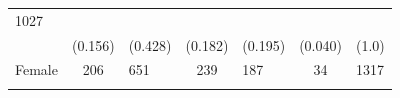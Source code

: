 \documentclass[11pt,a4paper,openany]{book}
\begin{document}
\begin{longtable}[]{@{}lclclcl@{}}
\begin{minipage}[t]{0.03\columnwidth}
1027\strut
\end{minipage}\tabularnewline
\begin{minipage}[t]{0.29\columnwidth}\raggedright\strut
\strut
\end{minipage} & \begin{minipage}[t]{0.29\columnwidth}\centering\strut
(0.156)\strut
\end{minipage} & \begin{minipage}[t]{0.04\columnwidth}\raggedright\strut
(0.428)\strut
\end{minipage} & \begin{minipage}[t]{0.06\columnwidth}\centering\strut
(0.182)\strut
\end{minipage} & \begin{minipage}[t]{0.04\columnwidth}\raggedright\strut
(0.195)\strut
\end{minipage} & \begin{minipage}[t]{0.04\columnwidth}\centering\strut
(0.040)\strut
\end{minipage} & \begin{minipage}[t]{0.03\columnwidth}\raggedright\strut
(1.0)\strut
\end{minipage}\tabularnewline
\begin{minipage}[t]{0.29\columnwidth}\raggedright\strut
Female\strut
\end{minipage} & \begin{minipage}[t]{0.29\columnwidth}\centering\strut
206\strut
\end{minipage} & \begin{minipage}[t]{0.04\columnwidth}\raggedright\strut
651\strut
\end{minipage} & \begin{minipage}[t]{0.06\columnwidth}\centering\strut
239\strut
\end{minipage} & \begin{minipage}[t]{0.04\columnwidth}\raggedright\strut
187\strut
\end{minipage} & \begin{minipage}[t]{0.04\columnwidth}\centering\strut
34\strut
\end{minipage} & \begin{minipage}[t]{0.03\columnwidth}\raggedright\strut
1317\strut
\end{minipage}\tabularnewline
\begin{minipage}[t]{0.29\columnwidth}\raggedright\strut
\strut
\end{minipage} & \begin{minipage}[t]{0.29\columnwidth}\centering\strut

\end{minipage}
\end{longtable}
\end{document}
